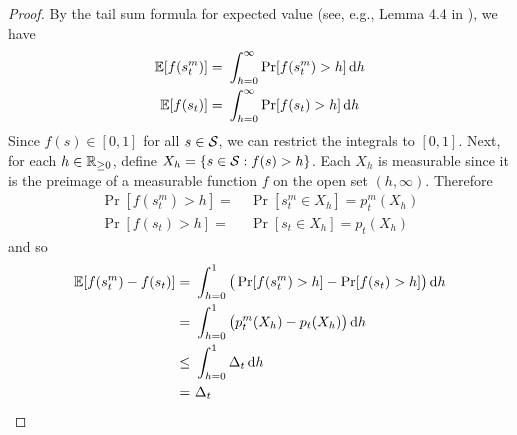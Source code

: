 \begin{proof}
By the tail sum formula for expected value (see, e.g., Lemma 4.4 in \citet{kallenberg1997foundations}), we have
\begin{align*}
\operatorname*{\mathbb{E}}[f(s_t^m)] =&\ \int_{h=0}^\infty \Pr[f(s_t^m) > h] \operatorname{d}\!{h}\\
\operatorname*{\mathbb{E}}[f(s_t)] =&\ \int_{h=0}^\infty \Pr[f(s_t) > h] \operatorname{d}\!{h}
\end{align*}
Since $f(s) \in [0,1]$ for all $s \in \mathcal{S}$, we can restrict the integrals to $[0,1]$. Next, for each $h \in \mathbb{R}_{\ge 0}$, define $X_h = \{s \in \mathcal{S}: f(s) > h\}$. Each $X_h$ is measurable since it is the preimage of a measurable function $f$ on the open set $(h, \infty)$. Therefore
\begin{align*}
\Pr[f(s_t^m) > h] =&\ \Pr[s_t^m \in X_h] = p_t^m(X_h)\\
\Pr[f(s_t) > h] =&\ \Pr[s_t \in X_h] = p_t(X_h)
\end{align*}
and so
\begin{align*}
\operatorname*{\mathbb{E}}[f(s_t^m) - f(s_t)] =&\ \int_{h=0}^1 \big(\Pr[f(s_t^m) > h] - \Pr[f(s_t) > h]\big) \operatorname{d}\!{h}\\
=&\ \int_{h=0}^1 \big(p_t^m(X_h) - p_t(X_h)\big) \operatorname{d}\!{h}\\
\le&\ \int_{h=0}^1 \Delta_t \operatorname{d}\!{h}\\
=&\ \Delta_t
\end{align*}
\end{proof}


\lemTrajInd*

